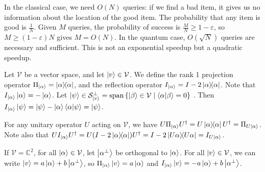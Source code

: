In the classical case, we need \( O(N) \) queries: if we find a bad item, it gives us no information about the location of the good item.
The probability that any item is good is \( \frac{1}{N} \).
Given \( M \) queries, the probability of success is \( \frac{M}{N} \geq 1 - \varepsilon \), so \( M \geq (1-\varepsilon)N \) gives \( M = O(N) \).
In the quantum case, \( O(\sqrt{N}) \) queries are necessary and sufficient.
This is not an exponential speedup but a quadratic speedup.

Let \( \mathcal V \) be a vector space, and let \( \ket{v} \in \mathcal V \).
We define the rank 1 projection operator \( \Pi_{\ket{\alpha}} = \op{\alpha}{\alpha} \), and the reflection operator \( I_{\ket{\alpha}} = I - 2 \op{\alpha}{\alpha} \).
Note that \( I_{\ket{\alpha}} \ket{\alpha} = - \ket{\alpha} \).
Let \( \ket{\psi} \in \mathcal S_{\ket{v}}^\perp = \vecspan\qty{\ket{\beta} \in \mathcal V \mid \ip{\alpha}{\beta} = 0} \) .
Then \( I_{\ket{\alpha}} \ket{\psi} = \ket{\psi} - \ket{\alpha}\ip{\alpha}{\psi} = \ket{\psi} \).

For any unitary operator \( U \) acting on \( \mathcal V \), we have \( U \Pi_{\ket{\alpha}} U^\dagger = U \op{\alpha}{\alpha} U^\dagger = \Pi_{U\ket{\alpha}} \).
Note also that \( U I_{\ket{\alpha}} U^\dagger = U(I - 2 \op{\alpha}{\alpha}) U^\dagger = I - 2 \op{U\alpha}{U\alpha} = I_{U\ket{\alpha}} \).

If \( \mathcal V = \mathbb C^2 \), for all \( \ket{\alpha} \in \mathcal V \), let \( \ket{\alpha^\perp} \) be orthogonal to \( \ket{\alpha} \).
For all \( \ket{v} \in \mathcal V \), we can write \( \ket{v} = a \ket{\alpha} + b \ket{\alpha^\perp} \), so \( \Pi_{\ket{\alpha}} \ket{v} = a \ket{\alpha} \) and \( I_{\ket{\alpha}} \ket{v} = -a\ket{\alpha} + b \ket{\alpha^\perp} \).

